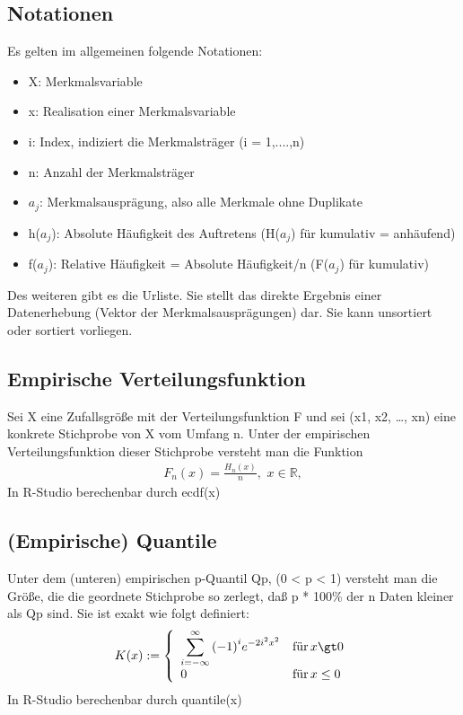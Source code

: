 \documentclass[a4paper,10pt]{scrartcl}
\begin{document}
\subsection{Notationen}
Es gelten im allgemeinen folgende Notationen:
\begin{itemize}
    \item X: Merkmalsvariable
    \item x: Realisation einer Merkmalsvariable
    \item i: Index, indiziert die Merkmalsträger (i = 1,....,n)
    \item n: Anzahl der Merkmalsträger
    \item \(a_j\): Merkmalsausprägung, also alle Merkmale ohne Duplikate
    \item h(\(a_j\)): Absolute Häufigkeit des Auftretens (H(\(a_j\)) für kumulativ = anhäufend)
    \item f(\(a_j\)): Relative Häufigkeit = Absolute Häufigkeit/n (F(\(a_j\)) für kumulativ)
\end{itemize}
Des weiteren gibt es die Urliste. Sie stellt das direkte Ergebnis einer Datenerhebung (Vektor der Merkmalsausprägungen) dar. Sie kann unsortiert oder sortiert vorliegen.
\subsection{Empirische Verteilungsfunktion}
Sei X eine Zufallsgröße mit der Verteilungsfunktion F und sei (x1, x2, …, xn) eine konkrete Stichprobe von X vom Umfang n. Unter der empirischen Verteilungsfunktion dieser Stichprobe versteht man die Funktion
\begin{eqnarray}{F}_{n}(x)=\frac{{H}_{n}(x)}{n},\,\,x\in {\mathbb{R}},\end{eqnarray}
In R-Studio berechenbar durch ecdf(x)
\subsection{(Empirische) Quantile}
Unter dem (unteren) empirischen p-Quantil Qp, (0 < p < 1) versteht man die Größe, die die geordnete Stichprobe so zerlegt, daß p * 100\% der n Daten kleiner als Qp sind. Sie ist exakt wie folgt definiert:
\begin{eqnarray}K(x):=\left\{\begin{array}{ll}\displaystyle \sum _{i=-\infty }^{\infty }{(-1)}^{i}{e}^{-2{i}^{2}{x}^{2}} & {\text{f}\rm{\ddot{u}}\text{r}}\,x\gt 0\\ 0 & {\text{f}\rm{\ddot{u}}\text{r}}\,x\le 0\end{array}\right.\end{eqnarray}
In R-Studio berechenbar durch quantile(x)
\end{document}
